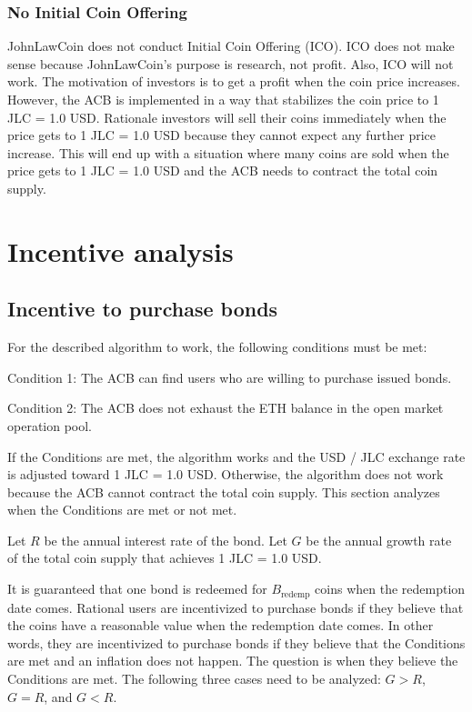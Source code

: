 \documentclass[dvipdfmx,a4paper]{article}
\begin{document}
\subsubsection{No Initial Coin Offering}

JohnLawCoin does not conduct Initial Coin Offering (ICO). ICO does not make sense because JohnLawCoin's purpose is research, not profit. Also, ICO will not work. The motivation of investors is to get a profit when the coin price increases. However, the ACB is implemented in a way that stabilizes the coin price to 1 JLC = 1.0 USD. Rationale investors will sell their coins immediately when the price gets to 1 JLC = 1.0 USD because they cannot expect any further price increase. This will end up with a situation where many coins are sold when the price gets to 1 JLC = 1.0 USD and the ACB needs to contract the total coin supply.

\section{Incentive analysis}

\subsection{Incentive to purchase bonds}

For the described algorithm to work, the following conditions must be met:

\begin{description}
\item{Condition 1}: The ACB can find users who are willing to purchase issued bonds.
\item{Condition 2}: The ACB does not exhaust the ETH balance in the open market operation pool.
\end{description}

If the Conditions are met, the algorithm works and the USD / JLC exchange rate is adjusted toward 1 JLC = 1.0 USD. Otherwise, the algorithm does not work because the ACB cannot contract the total coin supply. This section analyzes when the Conditions are met or not met.

Let $R$ be the annual interest rate of the bond. Let $G$ be the annual growth rate of the total coin supply that achieves 1 JLC = 1.0 USD.

It is guaranteed that one bond is redeemed for $B_{\mathrm{redemp}}$ coins when the redemption date comes. Rational users are incentivized to purchase bonds if they believe that the coins have a reasonable value when the redemption date comes. In other words, they are incentivized to purchase bonds if they believe that the Conditions are met and an inflation does not happen. The question is when they believe the Conditions are met. The following three cases need to be analyzed: $G>R$, $G=R$, and $G<R$.
\end{document}
